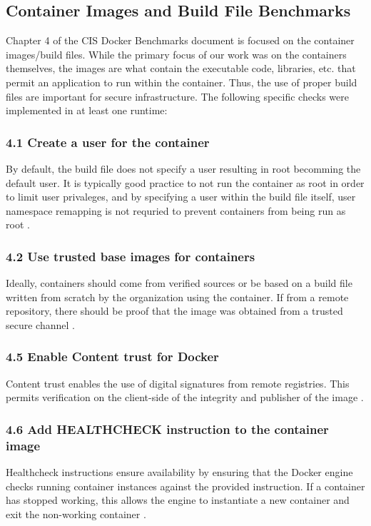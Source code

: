 \subsection*{Container Images and Build File Benchmarks}
Chapter 4 of the CIS Docker Benchmarks document is focused on the container images/build files. While the primary focus of our work was on the containers themselves, the images are what contain the executable code, libraries, etc. that permit an application to run within the container. Thus, the use of proper build files are important for secure infrastructure. The following specific checks were implemented in at least one runtime:

\subsubsection*{4.1 Create a user for the container} By default, the build file does not specify a user resulting in root becomming the default user. It is typically good practice to not run the container as root in order to limit user privaleges, and by specifying a user within the build file itself, user namespace remapping is not requried to prevent containers from being run as root \cite[pp 105-6]{center_for_internet_security}.

\subsubsection*{4.2 Use trusted base images for containers}  Ideally, containers should come from verified sources or be based on a build file written from scratch by the organization using the container. If from a remote repository, there should be proof that the image was obtained from a trusted secure channel \cite[pp  107-8]{center_for_internet_security}.

\subsubsection*{4.5 Enable Content trust for Docker} Content trust enables the use of digital signatures from remote registries. This permits verification on the client-side of the integrity and publisher of the image \cite[pp 113-4]{center_for_internet_security}.

\subsubsection*{4.6 Add HEALTHCHECK instruction to the container image} Healthcheck instructions ensure availability by ensuring that the Docker engine checks running container instances against the provided instruction. If a container has stopped working, this allows the engine to instantiate a new container and exit the non-working container \cite[p 115]{center_for_internet_security}.

